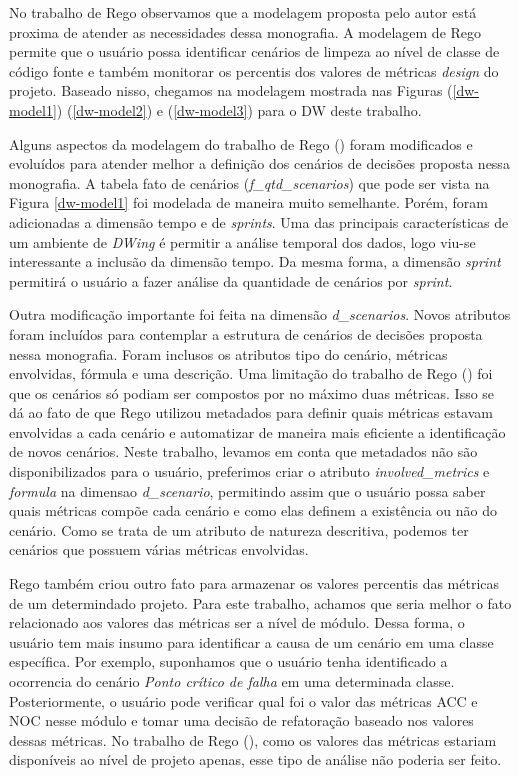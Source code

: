 No trabalho de Rego \citeyear{rego2014} observamos que a modelagem proposta pelo autor está proxima de atender as necessidades dessa monografia. A modelagem de Rego \citeyear{rego2014} permite que o usuário possa identificar cenários de limpeza ao nível de classe de código fonte e também monitorar os percentis dos valores de métricas \emph{design} do projeto. Baseado nisso, chegamos na modelagem mostrada nas Figuras (\ref{dw-model1}) (\ref{dw-model2}) e (\ref{dw-model3}) para o DW deste trabalho.

Alguns aspectos da modelagem do trabalho de Rego (\citeyear{rego2014}) foram modificados e evoluídos para atender melhor a definição dos cenários de decisões proposta nessa monografia. A tabela fato de cenários (\emph{f\_qtd\_scenarios}) que pode ser vista na Figura \ref{dw-model1}  foi modelada de maneira muito semelhante. Porém, foram adicionadas a dimensão tempo e de \emph{sprints}. Uma das principais características de um ambiente de \emph{DWing} é permitir a análise temporal dos dados, logo viu-se interessante a inclusão da dimensão tempo. Da mesma forma, a dimensão \emph{sprint} permitirá o usuário a fazer análise da quantidade de cenários por \emph{sprint}. 

Outra modificação importante foi feita na dimensão \emph{d\_scenarios}. Novos atributos foram incluídos para contemplar a estrutura de cenários de decisões proposta nessa monografia. Foram inclusos os atributos tipo do cenário, métricas envolvidas, fórmula e uma descrição. Uma limitação do trabalho de Rego (\citeyear{rego2014}) foi que os cenários só podiam ser compostos por no máximo duas métricas. Isso se dá ao fato de que Rego utilizou  metadados para definir quais métricas estavam envolvidas a cada cenário e automatizar de maneira mais eficiente a identificação de novos cenários. Neste trabalho, levamos em conta que  metadados não são disponibilizados para o usuário, preferimos criar o atributo \emph{involved\_metrics} e \emph{formula} na dimensao \emph{d\_scenario}, permitindo assim que o usuário possa saber quais métricas compõe cada cenário e como elas definem a existência ou não do cenário. Como se trata de um atributo de natureza descritiva, podemos ter cenários que possuem várias métricas envolvidas.

Rego também criou outro fato para armazenar os valores percentis das métricas de um determindado projeto. Para este trabalho, achamos que seria melhor o fato relacionado aos valores das métricas ser a nível de módulo. Dessa forma, o usuário tem mais insumo para identificar a causa de um cenário em uma classe específica. Por exemplo, suponhamos que o usuário tenha identificado a ocorrencia do cenário \emph{Ponto crítico de falha} em uma determinada classe. Posteriormente, o usuário pode verificar qual foi o valor das métricas ACC e NOC nesse módulo e tomar uma decisão de refatoração baseado nos valores dessas métricas. No trabalho de Rego (\citeyear{rego2014}), como os valores das métricas estariam disponíveis ao nível de projeto apenas, esse tipo de análise não poderia ser feito.

